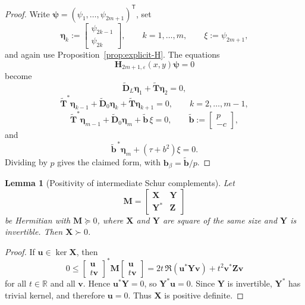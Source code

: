 \documentclass[11pt]{article}
\newtheorem{lemma}[theorem]{Lemma}
\begin{document}
\begin{proof}
Write \(\boldsymbol{\psi}=(\psi_1,\dots,\psi_{2m+1})^{\mathsf T}\), set
\[
\boldsymbol{\eta}_k:=
\begin{bmatrix}
\psi_{2k-1}\\
\psi_{2k}
\end{bmatrix},
\qquad k=1,\dots,m,
\qquad
\xi:=\psi_{2m+1},
\]
and again use Proposition~\ref{prop:explicit-H}. The equations
\[
\mathbf{H}_{2m+1,\varepsilon}(x,y)\boldsymbol{\psi}=0
\]
become
\[
\widetilde{\mathbf{D}}_L\boldsymbol{\eta}_1+\widetilde{\mathbf{T}}\boldsymbol{\eta}_2=0,
\]
\[
\widetilde{\mathbf{T}}^*\boldsymbol{\eta}_{k-1}+\widetilde{\mathbf{D}}_0\boldsymbol{\eta}_k+\widetilde{\mathbf{T}}\boldsymbol{\eta}_{k+1}=0,
\qquad k=2,\dots,m-1,
\]
\[
\widetilde{\mathbf{T}}^*\boldsymbol{\eta}_{m-1}+\widetilde{\mathbf{D}}_0\boldsymbol{\eta}_m+\widetilde{\mathbf{b}}\,\xi=0,
\qquad
\widetilde{\mathbf{b}}:=
\begin{bmatrix}
p\\
-c
\end{bmatrix},
\]
and
\[
\widetilde{\mathbf{b}}^{\,*}\boldsymbol{\eta}_m+(\tau+b^2)\xi=0.
\]
Dividing by \(p\) gives the claimed form, with \(\mathbf{b}_\beta=\widetilde{\mathbf{b}}/p\).
\end{proof}

\begin{lemma}[Positivity of intermediate Schur complements]\label{lem:intermediate-Schur-positive}
Let
\[
\mathbf{M}=
\begin{bmatrix}
\mathbf{X} & \mathbf{Y}\\
\mathbf{Y}^* & \mathbf{Z}
\end{bmatrix}
\]
be Hermitian with \(\mathbf{M}\succeq 0\), where \(\mathbf{X}\) and \(\mathbf{Y}\) are square of the same size and \(\mathbf{Y}\) is invertible.
Then \(\mathbf{X}\succ 0\).
\end{lemma}

\begin{proof}
If \(\mathbf{u}\in\ker \mathbf{X}\), then
\[
0\le
\begin{bmatrix}
\mathbf{u}\\ t\mathbf{v}
\end{bmatrix}^*
\mathbf{M}
\begin{bmatrix}
\mathbf{u}\\ t\mathbf{v}
\end{bmatrix}
=2t\,\Re(\mathbf{u}^*\mathbf{Y}\mathbf{v})+t^2\mathbf{v}^*\mathbf{Z}\mathbf{v}
\]
for all \(t\in\mathbb{R}\) and all \(\mathbf{v}\). Hence \(\mathbf{u}^*\mathbf{Y}=0\), so \(\mathbf{Y}^*\mathbf{u}=0\). Since \(\mathbf{Y}\) is invertible, \(\mathbf{Y}^*\) has trivial kernel, and therefore \(\mathbf{u}=0\). Thus \(\mathbf{X}\) is positive definite.
\end{proof}
\end{document}
